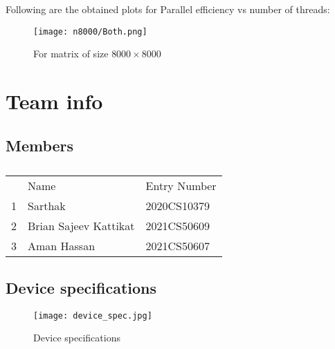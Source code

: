 \documentclass{article}
\begin{document}
Following are the obtained plots for Parallel efficiency vs number of threads:

\begin{figure}[!htb]
    \centering
    \texttt{[image: n8000/Both.png]}
    \caption{For matrix of size $8000 \times 8000$ }
\end{figure}

\clearpage

\section{Team info}

\subsection{Members}

\begin{table}[!htb]
	\centering
	\begin{tabular}{lll}
		  & Name                  & Entry Number \\
		1 & Sarthak               & 2020CS10379  \\
		2 & Brian Sajeev Kattikat & 2021CS50609  \\
		3 & Aman Hassan           & 2021CS50607 
	\end{tabular}
	\caption{}
	\label{team_members}
\end{table}

\subsection{Device specifications}

\begin{figure}[!htb]
    \centering
    \texttt{[image: device\_spec.jpg]}
    \caption{Device specifications}
\end{figure}
\end{document}
